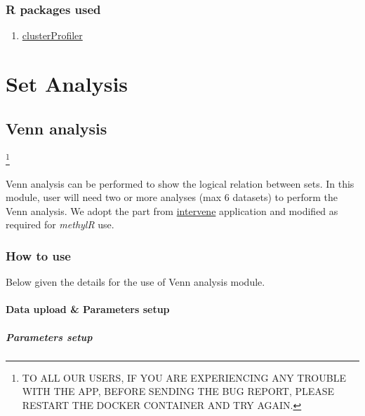 \documentclass[
  a4paper,
  DIV=11,
  numbers=noendperiod,
  oneside,
  open=any]{scrreport}
\providecommand{\tightlist}{%
  \setlength{\itemsep}{0pt}\setlength{\parskip}{0pt}}\usepackage{longtable,booktabs,array}
\begin{document}
\section{R packages used}\label{r-packages-used-3}

\begin{enumerate}
\def\labelenumi{\arabic{enumi}.}
\tightlist
\item
  \href{https://bioconductor.org/packages/release/bioc/vignettes/clusterProfiler/inst/doc/clusterProfiler.html}{clusterProfiler}
\end{enumerate}

\part{Set Analysis}

\chapter{Venn analysis}\label{sec-venn}

\footnote{TO ALL OUR USERS, IF YOU ARE EXPERIENCING ANY TROUBLE WITH THE
  APP, BEFORE SENDING THE BUG REPORT, PLEASE RESTART THE DOCKER
  CONTAINER AND TRY AGAIN.}

Venn analysis can be performed to show the logical relation between
sets. In this module, user will need two or more analyses (max 6
datasets) to perform the Venn analysis. We adopt the part from
\href{https://github.com/asntech/intervene}{intervene}
\autocite{khan2017intervene} application and modified as required for
\emph{methylR} use.

\section{How to use}\label{how-to-use-6}

Below given the details for the use of Venn analysis module.

\subsection{Data upload \& Parameters
setup}\label{data-upload-parameters-setup-2}

\subsubsection{Parameters setup}\label{parameters-setup-1}
\end{document}
